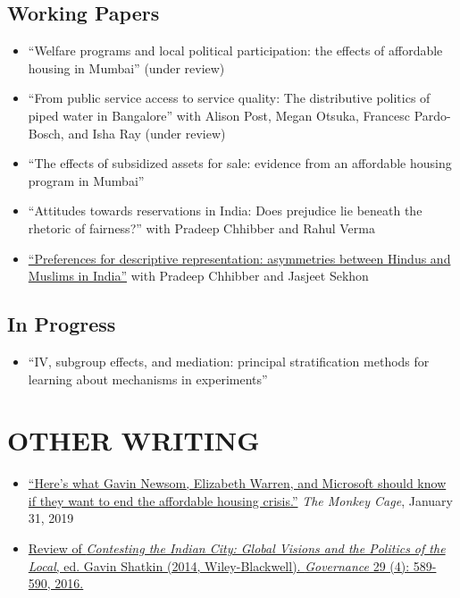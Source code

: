 \documentclass[11pt]{article}
\begin{document}
\subsection*{Working Papers}

\begin{itemize}
	\item[]``Welfare programs and local political participation: the effects of affordable housing in Mumbai'' (under review)

		\item[]``From public service access to service quality: The distributive politics of piped water in Bangalore'' with Alison Post, Megan Otsuka, Francesc Pardo-Bosch, and Isha Ray (under review)
		\item[]``The effects of subsidized assets for sale: evidence from an affordable housing program in Mumbai'' 
		\item[]``Attitudes towards reservations in India: Does prejudice lie beneath the rhetoric of fairness?'' with Pradeep Chhibber and Rahul Verma
		\item[] \href{http://sekhon.berkeley.edu/papers/cks_public.pdf}{``Preferences for descriptive representation: asymmetries between Hindus and Muslims in India''} with Pradeep Chhibber and Jasjeet Sekhon
\end{itemize}

\subsection*{In Progress}
\begin{itemize}
	\item[] ``IV, subgroup effects, and mediation: principal stratification methods for learning about mechanisms in experiments''
	\end{itemize}

\section*{OTHER WRITING}
\begin{itemize}
\item[]\href{https://www.washingtonpost.com/news/monkey-cage/wp/2019/01/31/heres-what-gavin-newsom-elizabeth-warren-and-microsoft-should-know-if-want-to-end-the-affordable-housing-crisis/?tid=sm_tw_cage}{``Here's what Gavin Newsom, Elizabeth Warren, and Microsoft should know if they want to end the affordable housing crisis.''} \textit{The Monkey Cage}, January 31, 2019
\item[] \href{http://onlinelibrary.wiley.com/doi/10.1111/gove.12241/abstract}{Review of \textit{Contesting the Indian City: Global Visions and the Politics of the Local}, ed. Gavin Shatkin (2014, Wiley-Blackwell). \textit{Governance} 29 (4): 589-590, 2016.} \
\end{itemize}
\end{document}
